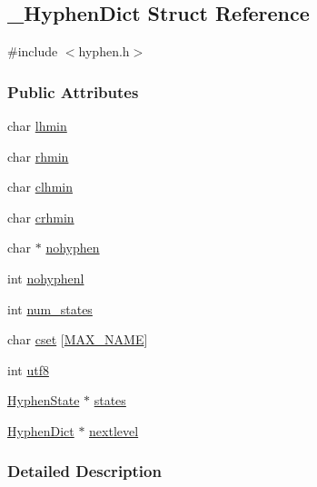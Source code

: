\hypertarget{struct___hyphen_dict}{\subsection{\-\_\-\-Hyphen\-Dict \-Struct \-Reference}
\label{struct___hyphen_dict}
}


{\ttfamily \#include $<$hyphen.\-h$>$}

\subsubsection*{\-Public \-Attributes}
\begin{DoxyCompactItemize}
\item 
char \hyperlink{struct___hyphen_dict_abadeccbce027b36645841686ad93d067}{lhmin}
\item 
char \hyperlink{struct___hyphen_dict_a3440b9768543e97e7e80d4ba29e1fa75}{rhmin}
\item 
char \hyperlink{struct___hyphen_dict_a651eac97882c11ba2416f21ab8a4ed79}{clhmin}
\item 
char \hyperlink{struct___hyphen_dict_a32f506e9ca1f4746acb0c41b33887e80}{crhmin}
\item 
char $\ast$ \hyperlink{struct___hyphen_dict_aca2a1b71c4669b45d9ae7ec1377dda2d}{nohyphen}
\item 
int \hyperlink{struct___hyphen_dict_a581693f2d9c912e4388759fae8623ef1}{nohyphenl}
\item 
int \hyperlink{struct___hyphen_dict_a82c9b7aefbd4dcec7302a9bbc2247acc}{num\-\_\-states}
\item 
char \hyperlink{struct___hyphen_dict_a53f12e09d8005867c7cbcc91a88befea}{cset} \mbox{[}\hyperlink{hyphen_8h_ac7c0207aa5a0e10d378be03b68041350}{\-M\-A\-X\-\_\-\-N\-A\-M\-E}\mbox{]}
\item 
int \hyperlink{struct___hyphen_dict_afd01aac8b36d018ec931891e0e95a570}{utf8}
\item 
\hyperlink{hyphen_8h_a633ccfbecf941f82b956182be6ffb59b}{\-Hyphen\-State} $\ast$ \hyperlink{struct___hyphen_dict_a27a77f586dc0a6925d074ba61294d985}{states}
\item 
\hyperlink{hyphen_8h_aa4f1bc9b13f797026fc4e49b8ea7928a}{\-Hyphen\-Dict} $\ast$ \hyperlink{struct___hyphen_dict_a6fb0dc613da914a03c2e09e0483246be}{nextlevel}
\end{DoxyCompactItemize}


\subsubsection{\-Detailed \-Description}


